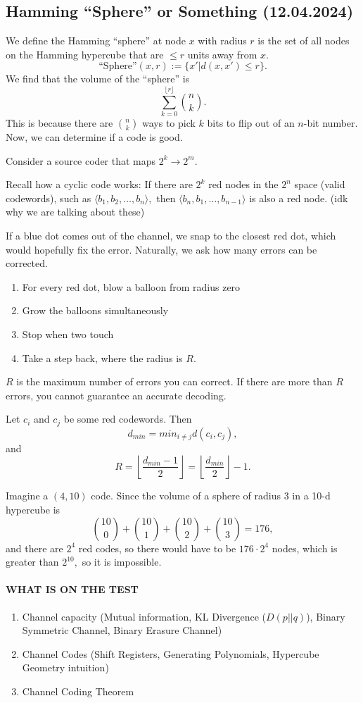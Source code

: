 \documentclass[12pt]{article}
\begin{document}
\subsection{Hamming ``Sphere'' or Something (12.04.2024)}
We define the Hamming ``sphere'' at node $x$ with radius $r$ is the set of all nodes on the Hamming hypercube that are $\le r$ units away from $x.$ 
\[\text{``Sphere''}(x,r):=\{x'|d(x,x')\le r\}.\]
We find that the volume of the ``sphere'' is
\[\sum_{k=0}^{\lfloor r\rfloor}\binom{n}{k}.\] This is because there are $\binom{n}{k}$ ways to pick $k$ bits to flip out of an $n$-bit number. Now, we can determine if a code is good. 

Consider a source coder that maps $2^k\to 2^m.$  

Recall how a cyclic code works: If there are $2^k$ red nodes in the $2^n$ space (valid codewords), such as $\langle b_1,b_2,\dots,b_n\rangle,$ then $\langle b_n,b_1,\dots,b_{n-1}\rangle$ is also a red node. (idk why we are talking about these)

If a blue dot comes out of the channel, we snap to the closest red dot, which would hopefully fix the error. Naturally, we ask how many errors can be corrected.
\begin{enumerate}
    \item For every red dot, blow a balloon from radius zero
    \item Grow the balloons simultaneously
    \item Stop when two touch
    \item Take a step back, where the radius is $R.$
\end{enumerate}
$R$ is the maximum number of errors you can correct. If there are more than $R$ errors, you cannot guarantee an accurate decoding.

Let $c_i$ and $c_j$ be some red codewords. Then
\[d_{min}=min_{i\ne j}d(c_i,c_j),\]
and 
\[R=\left\lfloor\frac{d_{min}-1}{2}\right\rfloor=\left\lfloor\frac{d_{min}}{2}\right\rfloor-1.\]

Imagine a $(4,10)$ code. Since the volume of a sphere of radius $3$ in a 10-d hypercube is 
\[\binom{10}{0}+\binom{10}{1}+\binom{10}{2}+\binom{10}{3}=176,\]
and there are $2^4$ red codes, so there would have to be
$176\cdot 2^4$ nodes, which is greater than $2^{10},$ so it is impossible.
\paragraph{WHAT IS ON THE TEST}
\begin{enumerate}
    \item Channel capacity (Mutual information, KL Divergence ($D(p||q)$), Binary Symmetric Channel, Binary Erasure Channel)
    \item Channel Codes (Shift Registers, Generating Polynomials, Hypercube Geometry intuition)
    \item Channel Coding Theorem
\end{enumerate}
\end{document}

